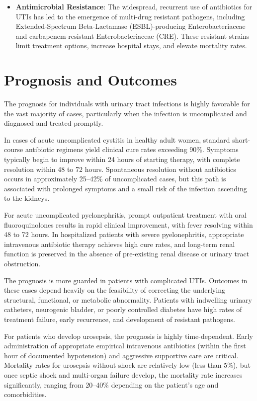 \begin{itemize}
    \item \textbf{Antimicrobial Resistance}: The widespread, recurrent use of antibiotics for UTIs has led to the emergence of multi-drug resistant pathogens, including Extended-Spectrum Beta-Lactamase (ESBL)-producing Enterobacteriaceae and carbapenem-resistant Enterobacteriaceae (CRE). These resistant strains limit treatment options, increase hospital stays, and elevate mortality rates.
\end{itemize}

\section*{Prognosis and Outcomes}
The prognosis for individuals with urinary tract infections is highly favorable for the vast majority of cases, particularly when the infection is uncomplicated and diagnosed and treated promptly.

In cases of acute uncomplicated cystitis in healthy adult women, standard short-course antibiotic regimens yield clinical cure rates exceeding 90\%. Symptoms typically begin to improve within 24 hours of starting therapy, with complete resolution within 48 to 72 hours. Spontaneous resolution without antibiotics occurs in approximately 25--42\% of uncomplicated cases, but this path is associated with prolonged symptoms and a small risk of the infection ascending to the kidneys.

For acute uncomplicated pyelonephritis, prompt outpatient treatment with oral fluoroquinolones results in rapid clinical improvement, with fever resolving within 48 to 72 hours. In hospitalized patients with severe pyelonephritis, appropriate intravenous antibiotic therapy achieves high cure rates, and long-term renal function is preserved in the absence of pre-existing renal disease or urinary tract obstruction.

The prognosis is more guarded in patients with complicated UTIs. Outcomes in these cases depend heavily on the feasibility of correcting the underlying structural, functional, or metabolic abnormality. Patients with indwelling urinary catheters, neurogenic bladder, or poorly controlled diabetes have high rates of treatment failure, early recurrence, and development of resistant pathogens.

For patients who develop urosepsis, the prognosis is highly time-dependent. Early administration of appropriate empirical intravenous antibiotics (within the first hour of documented hypotension) and aggressive supportive care are critical. Mortality rates for urosepsis without shock are relatively low (less than 5\%), but once septic shock and multi-organ failure develop, the mortality rate increases significantly, ranging from 20--40\% depending on the patient's age and comorbidities.

